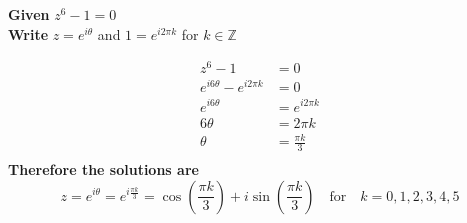 \documentclass[a4paper, 8pt]{extarticle}
\begin{document}
\begin{examplebox}[Determine all solutions to $z^6 -1 = 0$ and factor $x^6-1$ as a product of linear and quadratic factors]
    \label{sol:2023Q1b}
    \textbf{Given} $z^6 -1 = 0$ \\
    \textbf{Write} $z = e^{i \theta}$ and $1 = e^{i 2 \pi k}$ for $k \in \mathbb{Z}$

    \begin{align*}
        z^6 -1                         & = 0               \\
        e^{i 6 \theta} - e^{i 2 \pi k} & = 0               \\
        e^{i 6 \theta}                 & = e^{i 2 \pi k}   \\
        6 \theta                       & = 2 \pi k         \\
        \theta                         & = \frac{\pi k}{3} \\
    \end{align*}
    \textbf{Therefore the solutions are}
    $$z = e^{i \theta} = e^{i \frac{\pi k}{3}} = \cos\left(\frac{\pi k}{3}\right) + i\sin\left(\frac{\pi k}{3}\right) \quad \text{for} \quad k = 0, 1, 2, 3, 4, 5$$


\end{examplebox}
\end{document}
